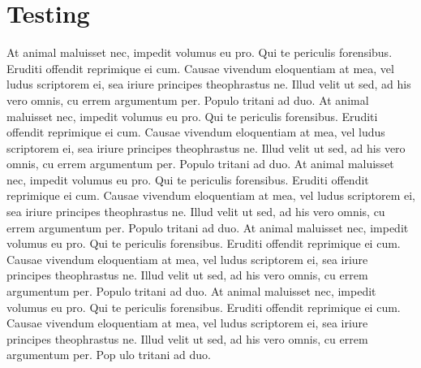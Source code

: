 \documentclass[10pt,]{book}
\begin{document}
\chapter{Testing}
At animal maluisset nec, impedit volumus eu pro. Qui te periculis forensibus. Eruditi offendit reprimique ei cum. Causae vivendum eloquentiam at mea, vel ludus scriptorem ei, sea iriure principes theophrastus ne. Illud velit ut sed, ad his vero omnis, cu errem argumentum per. Populo tritani ad duo.
At animal maluisset nec, impedit volumus eu pro. Qui te periculis forensibus. Eruditi offendit reprimique ei cum. Causae vivendum eloquentiam at mea, vel ludus scriptorem ei, sea iriure principes theophrastus ne. Illud velit ut sed, ad his vero omnis, cu errem argumentum per. Populo tritani ad duo.
At animal maluisset nec, impedit volumus eu pro. Qui te periculis forensibus. Eruditi offendit reprimique ei cum. Causae vivendum eloquentiam at mea, vel ludus scriptorem ei, sea iriure principes theophrastus ne. Illud velit ut sed, ad his vero omnis, cu errem argumentum per. Populo tritani ad duo.
At animal maluisset nec, impedit volumus eu pro. Qui te periculis forensibus. Eruditi offendit reprimique ei cum. Causae vivendum eloquentiam at mea, vel ludus scriptorem ei, sea iriure principes theophrastus ne. Illud velit ut sed, ad his vero omnis, cu errem argumentum per. Populo tritani ad duo.
At animal maluisset nec, impedit volumus eu pro. Qui te periculis forensibus. Eruditi offendit reprimique ei cum. Causae vivendum eloquentiam at mea, vel ludus scriptorem ei, sea iriure principes theophrastus ne. Illud velit ut sed, ad his vero omnis, cu errem argumentum per. Pop
ulo tritani ad duo.

\lipsum[3]
\end{document}

